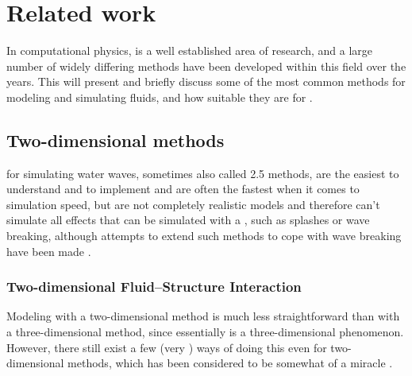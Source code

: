 \chapter{Related work}
\label{chap:relatedwork}


In computational physics, \CFD is a well established area of research, and a large number of widely differing methods have been developed within this field over the years. This \levelname will present and briefly discuss some of the most common methods for modeling and simulating fluids, and how suitable they are for \thisprojectwork.

\section{Two-dimensional methods}

 for simulating water waves, sometimes also called 2.5 methods, are the easiest to understand and to implement and are often the fastest when it comes to simulation speed, but are not completely realistic models and therefore can't simulate all effects that can be simulated with a , such as splashes or wave breaking, although attempts to extend such methods to cope with wave breaking have been made \citep[e.g.][]{Miklos2009}.

\subsection{Two-dimensional Fluid--Structure Interaction}

\label{sec:illumination_model_derivation}

Modeling \FSI with a two-dimensional method is much less straightforward than with a three-dimensional method, since \FSI essentially is a three-dimensional phenomenon. However, there still exist a few (very \approximating) ways of doing this even for two-dimensional methods, which has been considered to be somewhat of a miracle \citep{Tessendorf2004}.

